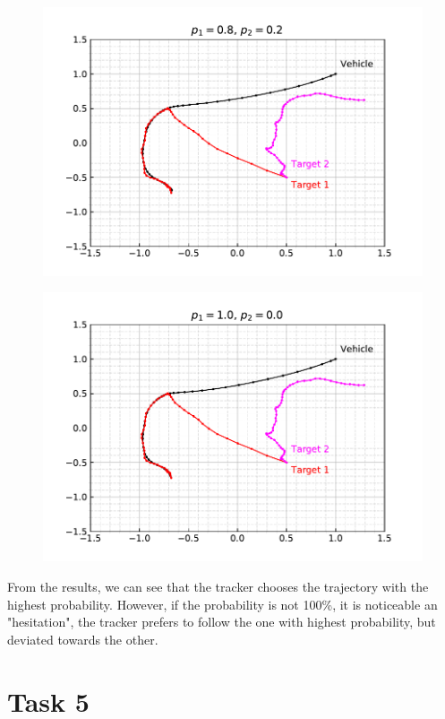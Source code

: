 \documentclass[12pt]{article}
\begin{document}
\begin{figure}[H]
    \centering
    \includegraphics{../../src/task_4/output/ex_4_i=5.pdf}
\end{figure}

\begin{figure}[H]
    \centering
    \includegraphics{../../src/task_4/output/ex_4_i=6.pdf}
\end{figure}

From the results, we can see that the tracker chooses the trajectory with the highest probability. However, if the probability is not 100\%, it is noticeable an "hesitation", the tracker prefers to follow the one with highest probability, but deviated towards the other. \\

\section{Task 5}
\end{document}
